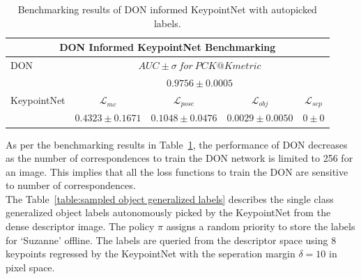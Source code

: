 \begin{table}[htb]
    \centering
    \begin{tabular}{lcccc}
        \hline
        \multicolumn{5}{c}{\ac{DON} Informed KeypointNet Benchmarking}                                                                                                                                                              \\ \hline
        \multicolumn{1}{l|}{\ac{DON}}    & \multicolumn{4}{c}{$AUC \pm \sigma \ for \ PCK@K metric$}                                                                                                                                \\
        \multicolumn{1}{l|}{}            & \multicolumn{4}{c}{$0.9756 \pm 0.0005$}                                                                                                                                                  \\ \hline
        \multicolumn{1}{l|}{KeypointNet} & \multicolumn{1}{c}{$\mathcal{L}_{mc}$}                    & \multicolumn{1}{c}{$\mathcal{L}_{pose}$} & \multicolumn{1}{c}{$\mathcal{L}_{obj}$} & \multicolumn{1}{c}{$\mathcal{L}_{sep}$} \\
        \multicolumn{1}{l|}{}            & \multicolumn{1}{c}{$0.4323 \pm 0.1671$}                   & \multicolumn{1}{c}{$0.1048 \pm 0.0476$}  & \multicolumn{1}{c}{$0.0029 \pm 0.0050$} & \multicolumn{1}{c}{$0\pm 0$}            \\ \hline
    \end{tabular}
    \caption{Benchmarking results of \ac{DON} informed KeypointNet with autopicked labels.}
    \label{table:don_informed_informed_benchmark}
\end{table}

As per the benchmarking results in Table~\ref{table:don_informed_informed_benchmark}, the performance of \ac{DON} decreases as the number of correspondences to train the \ac{DON} network is limited to 256 for an image.
This implies that all the loss functions to train the \ac{DON} are sensitive to number of correspondences.\\

The Table~\ref{table:sampled object generalized labels} describes the single class generalized object labels autonomously picked by the KeypointNet from the dense descriptor image. The policy $\pi$ assigns a random
priority to store the labels for `Suzanne' offline. The labels are queried from the descriptor space using 8 keypoints regressed by the KeypointNet with the seperation margin
$\delta = 10$ in pixel space.

